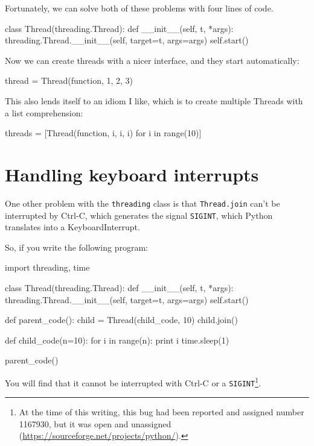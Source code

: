 \documentclass{book}
\begin{document}
Fortunately, we can solve both of these problems with four
lines of code.

\begin{unbreakable}[title={Cleaned-up Thread class}]{}
class Thread(threading.Thread):
 def __init__(self, t, *args):
  threading.Thread.__init__(self, 
   target=t, args=args)
  self.start()
\end{unbreakable}

Now we can create threads with a nicer interface, and they
start automatically:

\begin{unbreakable}[title={Thread example (my way)}]{}
thread = Thread(function, 1, 2, 3)
\end{unbreakable}

This also lends itself to an idiom I like, which is to create
multiple Threads with a list comprehension:

\begin{unbreakable}[title={Multiple thread example}]{}
threads = [Thread(function, i, i, i)  
 for i in range(10)]
\end{unbreakable}

\section{Handling keyboard interrupts}

One other problem with the {\tt threading} class is that
    {\tt Thread.join} can't be interrupted by Ctrl-C, which
generates the signal {\tt SIGINT}, which Python translates
into a KeyboardInterrupt.


So, if you write the following program:

\begin{unbreakable}[title={Unstoppable program}]{}
import threading, time

class Thread(threading.Thread):
 def __init__(self, t, *args):
  threading.Thread.__init__(self, 
   target=t, args=args)
  self.start()

def parent_code():
 child = Thread(child_code, 10)
 child.join()

def child_code(n=10):
 for i in range(n):
  print i
  time.sleep(1)
    
parent_code()
\end{unbreakable}

You will find that it cannot be interrupted with Ctrl-C or
a {\tt SIGINT}\footnote{At the time of this writing, this
    bug had been reported and assigned number 1167930, but it was
    open and unassigned (\url{https://sourceforge.net/projects/python/}).}.
\end{document}
